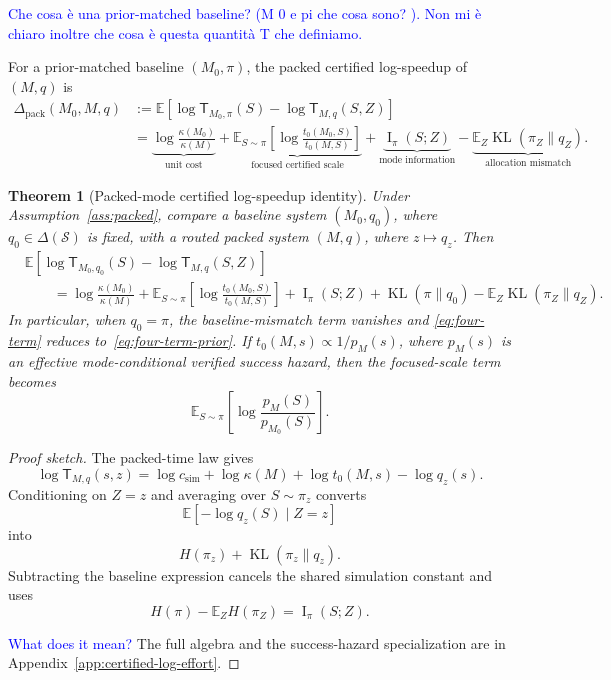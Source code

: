 \documentclass{article}
\newtheorem{theorem}{Theorem}
\DeclareMathOperator{\KL}{KL}
\DeclareMathOperator{\MI}{I}
\newcommand{\cS}{\mathcal{S}}
\newcommand{\E}{\mathbb{E}}
\begin{document}
\textcolor{blue}{Che cosa è una prior-matched baseline? (M 0 e pi che cosa sono? ). Non mi è chiaro inoltre che cosa è questa quantità T che definiamo.}

For a prior-matched baseline \((M_0,\pi)\), the packed certified log-speedup of
\((M,q)\) is
\begin{equation}
\label{eq:four-term-prior}
\begin{aligned}
    \Delta_{\mathrm{pack}}(M_0,M,q)
    &:=
    \E\!\left[
        \log \mathsf T_{M_0,\pi}(S)
        -
        \log \mathsf T_{M,q}(S,Z)
    \right]
    \\
    &=
    \underbrace{\log\frac{\kappa(M_0)}{\kappa(M)}}_{\text{unit cost}}
    +
    \underbrace{
    \E_{S\sim\pi}
    \left[
        \log\frac{t_0(M_0,S)}{t_0(M,S)}
    \right]
    }_{\text{focused certified scale}}
    +
    \underbrace{\MI_\pi(S;Z)}_{\text{mode information}}
    -
    \underbrace{\E_Z\KL(\pi_Z\|q_Z)}_{\text{allocation mismatch}} .
\end{aligned}
\end{equation}

\begin{theorem}[Packed-mode certified log-speedup identity]
\label{thm:four-term}
Under Assumption~\ref{ass:packed}, compare a baseline system \((M_0,q_0)\), where
\(q_0\in\Delta(\cS)\) is fixed, with a routed packed system \((M,q)\), where
\(z\mapsto q_z\).  Then
\begin{equation}
\label{eq:four-term}
\begin{aligned}
&\E\!\left[
    \log \mathsf T_{M_0,q_0}(S)
    -
    \log \mathsf T_{M,q}(S,Z)
\right]
\\
&\qquad =
\log\frac{\kappa(M_0)}{\kappa(M)}
+
\E_{S\sim\pi}
\left[
    \log\frac{t_0(M_0,S)}{t_0(M,S)}
\right]
+
\MI_\pi(S;Z)
+
\KL(\pi\|q_0)
-
\E_Z\KL(\pi_Z\|q_Z).
\end{aligned}
\end{equation}
In particular, when \(q_0=\pi\), the baseline-mismatch term vanishes and
\eqref{eq:four-term} reduces to~\eqref{eq:four-term-prior}.
If \(t_0(M,s)\propto 1/p_M(s)\), where \(p_M(s)\) is an effective mode-conditional
verified success hazard, then the focused-scale term becomes
\[
    \E_{S\sim\pi}
    \left[
        \log\frac{p_M(S)}{p_{M_0}(S)}
    \right].
\]
\end{theorem}

\begin{proof}[Proof sketch]
The packed-time law gives
\[
    \log \mathsf T_{M,q}(s,z)
    =
    \log c_{\mathrm{sim}}
    +
    \log\kappa(M)
    +
    \log t_0(M,s)
    -
    \log q_z(s).
\]
Conditioning on \(Z=z\) and averaging over \(S\sim\pi_z\) converts
\[
    \E[-\log q_z(S)\mid Z=z]
\]
into
\[
    H(\pi_z)+\KL(\pi_z\|q_z).
\]
Subtracting the baseline expression cancels the shared simulation constant and uses
\[
    H(\pi)-\E_ZH(\pi_Z)=\MI_\pi(S;Z).
\]

\textcolor{blue}{What does it mean?}
The full algebra and the success-hazard specialization are in
Appendix~\ref{app:certified-log-effort}.
\end{proof}
\end{document}
